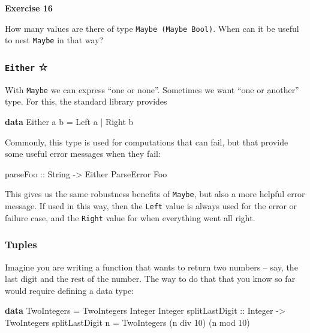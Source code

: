 \documentclass[11pt,
  american,
  DIV13]{article}
\newenvironment{Shaded}{}{}
\newcommand{\DataTypeTok}[1]{\textcolor[rgb]{0.56,0.13,0.00}{#1}}
\newcommand{\DecValTok}[1]{\textcolor[rgb]{0.25,0.63,0.44}{#1}}
\newcommand{\KeywordTok}[1]{\textcolor[rgb]{0.00,0.44,0.13}{\textbf{#1}}}
\newcommand{\NormalTok}[1]{#1}
\newcommand{\OperatorTok}[1]{\textcolor[rgb]{0.40,0.40,0.40}{#1}}
\newcommand{\OtherTok}[1]{\textcolor[rgb]{0.00,0.44,0.13}{#1}}
\begin{document}
\textbf{Exercise 16}

How many values are there of type \texttt{Maybe\ (Maybe\ Bool)}. When
can it be useful to nest \texttt{Maybe} in that way?

\hypertarget{either}{%
\subsubsection{\texorpdfstring{\texttt{Either}
☆}{Either ☆}}\label{either}}

With \texttt{Maybe} we can express ``one or none''. Sometimes we want
``one or another'' type. For this, the standard library provides

\begin{Shaded}
\begin{Highlighting}[]
\KeywordTok{data} \DataTypeTok{Either}\NormalTok{ a b }\OtherTok{=} \DataTypeTok{Left}\NormalTok{ a }\OperatorTok{|} \DataTypeTok{Right}\NormalTok{ b}
\end{Highlighting}
\end{Shaded}

Commonly, this type is used for computations that can fail, but that
provide some useful error messages when they fail:

\begin{Shaded}
\begin{Highlighting}[]
\OtherTok{parseFoo ::} \DataTypeTok{String} \OtherTok{{-}\textgreater{}} \DataTypeTok{Either} \DataTypeTok{ParseError} \DataTypeTok{Foo}
\end{Highlighting}
\end{Shaded}

This gives us the same robustness benefits of \texttt{Maybe}, but also a
more helpful error message. If used in this way, then the \texttt{Left}
value is always used for the error or failure case, and the
\texttt{Right} value for when everything went all right.

\hypertarget{tuples}{%
\subsubsection{Tuples}\label{tuples}}

Imagine you are writing a function that wants to return two numbers --
say, the last digit and the rest of the number. The way to do that that
you know so far would require defining a data type:

\begin{Shaded}
\begin{Highlighting}[]
\KeywordTok{data} \DataTypeTok{TwoIntegers} \OtherTok{=} \DataTypeTok{TwoIntegers} \DataTypeTok{Integer} \DataTypeTok{Integer}
\OtherTok{splitLastDigit ::} \DataTypeTok{Integer} \OtherTok{{-}\textgreater{}} \DataTypeTok{TwoIntegers}
\NormalTok{splitLastDigit n }\OtherTok{=} \DataTypeTok{TwoIntegers}\NormalTok{ (n }\OtherTok{\textasciigrave{}div\textasciigrave{}} \DecValTok{10}\NormalTok{) (n }\OtherTok{\textasciigrave{}mod\textasciigrave{}} \DecValTok{10}\NormalTok{)}
\end{Highlighting}
\end{Shaded}
\end{document}
